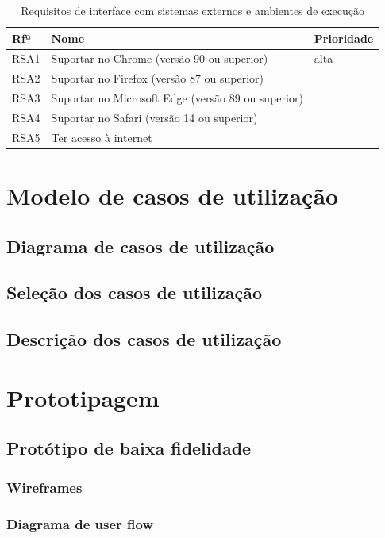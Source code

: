 \documentclass[11pt, twoside]{report}
\begin{document}
	\begin{table}[H]
		\centering
		\caption{Requisitos de interface com sistemas externos e ambientes de execução}	
		\vspace{0.5cm}
		\begin{tabular}{|l|l|l|}
			\hline
			Rfª & Nome & Prioridade\\
			\hline
			RSA1 & Suportar no Chrome (versão 90 ou superior) &alta\\
			\hline
			RSA2 &Suportar no Firefox (versão 87 ou superior) &\\
			\hline
			RSA3 &Suportar no Microsoft Edge (versão 89 ou superior)&\\
			\hline
			RSA4 &Suportar no Safari (versão 14 ou superior)&\\
			\hline
			RSA5 &Ter acesso à internet&\\
			\hline
		\end{tabular}
		\label{requisitosdesistemas}
	\end{table}
	
	\chapter{Modelo de casos de utilização}
	\section{Diagrama de casos de utilização}
	\section{Seleção dos casos de utilização}
	\section{Descrição dos casos de utilização}
	
	\chapter{Prototipagem}
	\section{Protótipo de baixa fidelidade}
	\subsection{Wireframes}
	\subsection{Diagrama de user flow}
\end{document}
